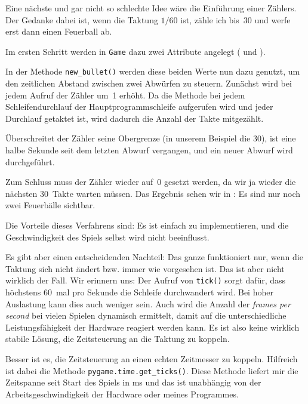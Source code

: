 Eine nächste und gar nicht so schlechte Idee wäre die Einführung einer Zählers. Der Gedanke dabei ist, wenn die Taktung $1/60$ ist, zähle ich bis~30 und werfe erst dann einen Feuerball ab. 

Im ersten Schritt werden in \texttt{Game} dazu zwei Attribute angelegt ( und ). 



In der Methode \texttt{new\_bullet()} werden diese beiden Werte nun dazu genutzt, um den zeitlichen Abstand zwischen zwei Abwürfen zu steuern. Zunächst wird bei jedem Aufruf der Zähler um~1 erhöht. Da die Methode bei jedem Schleifendurchlauf der Hauptprogrammschleife aufgerufen wird und jeder Durchlauf getaktet ist, wird dadurch die Anzahl der Takte mitgezählt. 

Überschreitet der Zähler seine Obergrenze (in unserem Beispiel die 30), ist eine halbe Sekunde seit dem letzten Abwurf vergangen, und ein neuer Abwurf wird durchgeführt. 

Zum Schluss muss der Zähler wieder auf~0 gesetzt werden, da wir ja wieder die nächsten 30~Takte warten müssen. Das Ergebnis sehen wir in : Es sind nur noch zwei Feuerbälle sichtbar.




Die Vorteile dieses Verfahrens sind: Es ist einfach zu implementieren, und die Geschwindigkeit des Spiels selbst wird nicht beeinflusst. 

Es gibt aber einen entscheidenden Nachteil: Das ganze funktioniert nur, wenn die Taktung sich nicht ändert bzw. immer wie vorgesehen ist. Das ist aber nicht wirklich der Fall. Wir erinnern uns: Der Aufruf von \texttt{tick()} sorgt dafür, dass höchstens 60~mal pro Sekunde die Schleife durchwandert wird. Bei hoher Auslastung kann dies auch weniger sein. Auch wird die Anzahl der \emph{frames per second} bei vielen Spielen dynamisch ermittelt, damit auf die unterschiedliche Leistungsfähigkeit der Hardware reagiert werden kann. Es ist also keine wirklich stabile Lösung, die Zeitsteuerung an die Taktung zu koppeln. 

Besser ist es, die Zeitsteuerung an einen echten Zeitmesser zu koppeln. Hilfreich ist dabei die Methode \texttt{pygame.time.get\_ticks()}. Diese Methode liefert mir die Zeitspanne seit Start des Spiels in \gls{ms} und das ist unabhängig von der Arbeitsgeschwindigkeit der Hardware oder meines Programmes.

